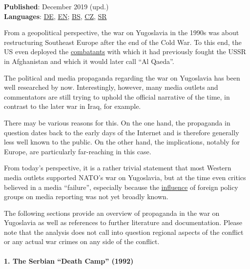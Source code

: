 \textbf{Published}: December 2019 (upd.)\\
\textbf{Languages}:
\href{https://swprs.org/propaganda-im-jugoslawienkrieg/}{DE},
\href{https://swprs.org/propaganda-in-the-war-on-yugoslavia/}{EN};
\href{https://mondo.ba/Info/Region/a923284/Trnopolje-Markale-Srebrenica-Racak-Podvale-oo-kojima-bruji-svijet.html}{BS},
\href{https://prima.iprima.cz/zpravodajstvi/svycari-o-valce-v-byvale-jugoslavii-dezinformacich-a-fake-news-medii-boju-se-ucastnila}{CZ},
\href{http://www.politika.rs/sr/clanak/444725/Na-Zapadu-se-urusava-mit-o-zlim-Srbima}{SR}

From a geopolitical perspective, the war on Yugoslavia in the 1990s was
about restructuring South­east Europe after the end of the Cold War. To
this end, the US even deployed the
\href{https://www.theguardian.com/world/2002/apr/22/warcrimes.comment}{combatants}
with which it had previously fought the USSR in Afghanistan and which it
would later call ``Al Qaeda''.

The political and media propaganda regarding the war on Yugoslavia has
been well researched by now. Interestingly, however, many media outlets
and commentators are still trying to uphold the official narrative of
the time, in contrast to the later war in Iraq, for example.

There may be various reasons for this. On the one hand, the propaganda
in question dates back to the early days of the Internet and is
therefore generally less well known to the public. On the other hand,
the implications, notably for Europe, are particularly far-reaching in
this case.

From today's perspective, it is a rather trivial statement that most
Western media outlets supported NATO's war on Yugoslavia, but at the
time even critics believed in a media ``failure'', especially because
the
\href{https://swprs.org/the-american-empire-and-its-media/}{influence}
of foreign policy groups on media reporting was not yet broadly known.

The following sections provide an overview of propaganda in the war on
Yugoslavia as well as references to further literature and
documentation. Please note that the analysis does not call into question
regional aspects of the conflict or any actual war crimes on any side of
the conflict.

\hypertarget{1-the-serbian-death-camp-1992}{%
\paragraph{1. The Serbian ``Death Camp''
(1992)}\label{1-the-serbian-death-camp-1992}}


